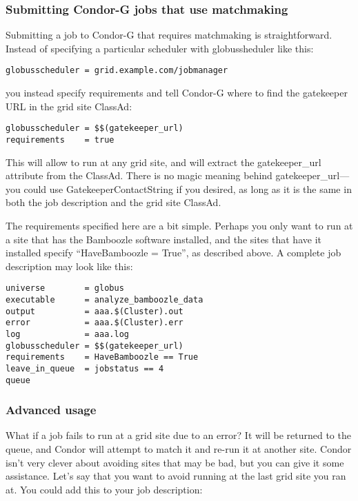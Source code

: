 \subsubsection{Submitting Condor-G jobs that use matchmaking}

Submitting a job to Condor-G that requires matchmaking is
straightforward. Instead of specifying a particular scheduler with
globussheduler like this:

\begin{verbatim}
globusscheduler = grid.example.com/jobmanager
\end{verbatim}

you instead specify requirements and tell Condor-G where to find the
gatekeeper URL in the grid site ClassAd:

\begin{verbatim}
globusscheduler = $$(gatekeeper_url)
requirements    = true
\end{verbatim}

This will allow to run at any grid site, and will extract the
gatekeeper\_url attribute from the ClassAd. There is no magic meaning
behind gatekeeper\_url---you could use GatekeeperContactString if you
desired, as long as it is the same in both the job description and the
grid site ClassAd. 

The requirements specified here are a bit simple. Perhaps you only
want to run at a site that has the Bamboozle software installed, and
the sites that have it installed specify ``HaveBamboozle = True'', as
described above. A complete job description may look like this:

\begin{verbatim}
universe        = globus
executable      = analyze_bamboozle_data
output          = aaa.$(Cluster).out
error           = aaa.$(Cluster).err
log             = aaa.log
globusscheduler = $$(gatekeeper_url)
requirements    = HaveBamboozle == True
leave_in_queue  = jobstatus == 4
queue
\end{verbatim}

\subsubsection{Advanced usage}

What if a job fails to run at a grid site due to an error? It will be
returned to the queue, and Condor will attempt to match it and
re-run it at another site. Condor isn't very clever about avoiding
sites that may be bad, but you can give it some assistance. Let's say
that you want to avoid running at the last grid site you ran at. You
could add this to your job description:


